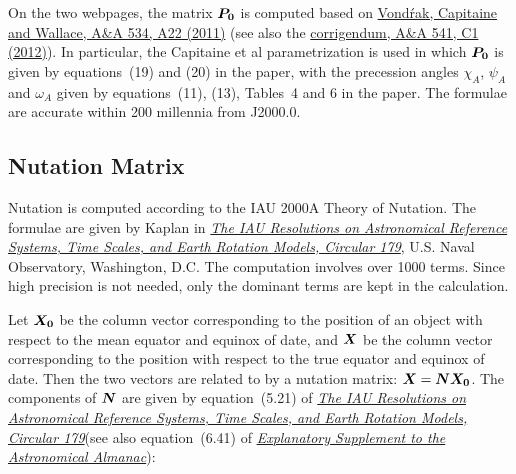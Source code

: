 \documentclass[12pt]{article}
\newcommand{\ve}[1]{\mbox{\boldmath $#1$}}
\newcommand{\expl}{\href{http://www.uscibooks.com/urban.htm}{\it Explanatory Supplement to the Astronomical Almanac}}
\newcommand{\kaplan}{\href{http://aa.usno.navy.mil/publications/docs/Circular_179.pdf}{\it The IAU Resolutions on Astronomical Reference Systems, Time Scales, and Earth Rotation Models, Circular 179}}
\begin{document}
On the two webpages, the matrix $\ve{P_0}$ is computed based on 
\href{http://adsabs.harvard.edu/abs/2011A%26A...534A..22V}{Vond\'rak, 
Capitaine and Wallace, A\&A 534, A22 (2011)} (see also the 
\href{https://www.aanda.org/articles/aa/pdf/2012/05/aa17274e-11.pdf}{corrigendum, 
A\&A 541, C1 (2012)}). In particular, the Capitaine et al parametrization is used in which 
$\ve{P_0}$ is given by equations~(19) and (20) in the paper, with the precession 
angles $\chi_A$, $\psi_A$ and $\omega_A$ given by equations~(11), (13), Tables~4 and 6 
in the paper. The formulae are accurate within 200 millennia from J2000.0. 

\subsection{Nutation Matrix} 
\label{sec:nutation}

Nutation is computed according to the IAU 2000A Theory of Nutation. The formulae 
are given by Kaplan in \kaplan, U.S. Naval Observatory, Washington, D.C. 
The computation involves over 1000 terms. Since high precision is not needed, 
only the dominant terms are kept in the calculation.

Let $\ve{X_0}$ be the column vector corresponding to the position of an object 
with respect to the mean equator and equinox of date, and $\ve{X}$ be the column 
vector corresponding to the position with respect to the true equator and equinox of date. 
Then the two vectors are related to by a nutation matrix: $\ve{X} = \ve{N} \ve{X_0}$. 
The components of $\ve{N}$ are given by equation~(5.21) of \kaplan (see also equation~(6.41) 
of \expl):
\end{document}
